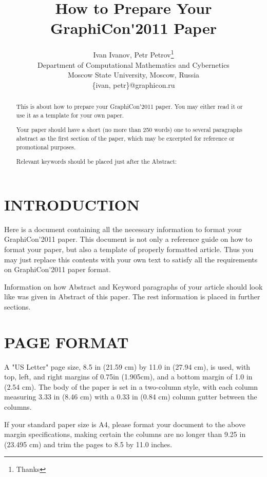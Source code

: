 \documentclass{graphicon}
\title{How to Prepare Your GraphiCon\'{}2011 Paper}
\author{Ivan Ivanov, Petr Petrov\thanks{Thanks}
\\Department of Computational Mathematics and Cybernetics
\\Moscow State University, Moscow, Russia
\\\{ivan, petr\}@graphicon.ru}
\begin{document}
\maketitle

\begin{abstract}

This is about how to prepare your GraphiCon\'{}2011 paper. You may either read it or use it as a template for your own paper.

Your paper should have a short (no more than 250 words) one to several paragraphs abstract as the first section of the paper, which may be excerpted for reference or promotional purposes.

Relevant keywords should be placed just after the Abstract:

\end{abstract}


\keywordlist


\section{INTRODUCTION}

Here is a document containing all the necessary information to format your GraphiCon\'{}2011 paper. This document is not only a reference guide on how to format your paper, but also a template of properly formatted article. Thus you may just replace this contents with your own text to satisfy all the requirements on GraphiCon\'{}2011 paper format.

Information on how Abstract and Keyword paragraphs of your article should look like was given in Abstract of this paper. The rest information is placed in further sections.

\section{PAGE FORMAT}

A "US Letter" page size, 8.5 in (21.59 cm) by 11.0 in (27.94 cm), is used, with top, left, and right margins of 0.75in (1.905cm), and a bottom margin of 1.0 in (2.54 cm). The body of the paper is set in a two-column style, with each column measuring 3.33 in (8.46 cm) with a 0.33 in (0.84 cm) column gutter between the columns.

If your standard paper size is A4, please format your document to the above margin specifications, making certain the columns are no longer than 9.25 in (23.495 cm) and trim the pages to 8.5 by 11.0 inches.
\end{document}
